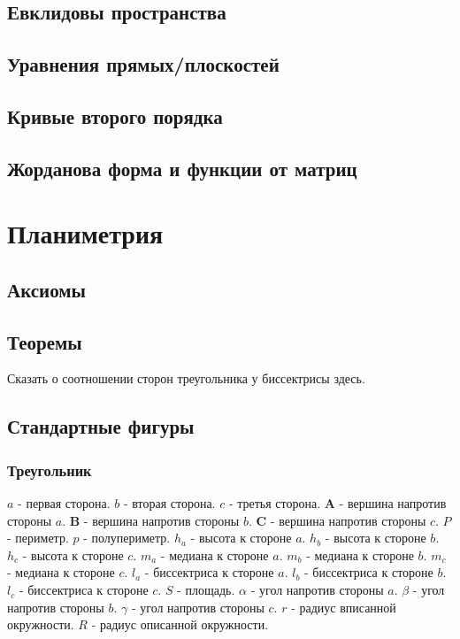 \subsection{Евклидовы пространства}

\subsection{Уравнения прямых/плоскостей}

\subsection{Кривые второго порядка}

\subsection{Жорданова форма и функции от матриц}


\section{Планиметрия}

\subsection{Аксиомы}

\subsection{Теоремы}

Сказать о соотношении сторон треугольника у биссектрисы здесь.

\subsection{Стандартные фигуры}

\subsubsection{Треугольник}

$a$ - первая сторона.
$b$ - вторая сторона.
$c$ - третья сторона.
$\boldsymbol{A}$ - вершина напротив стороны $a$.
$\boldsymbol{B}$ - вершина напротив стороны $b$.
$\boldsymbol{C}$ - вершина напротив стороны $c$.
$P$ - периметр.
$p$ - полупериметр.
$h_a$ - высота к стороне $a$.
$h_b$ - высота к стороне $b$.
$h_c$ - высота к стороне $c$.
$m_a$ - медиана к стороне $a$.
$m_b$ - медиана к стороне $b$.
$m_c$ - медиана к стороне $c$.
$l_a$ - биссектриса к стороне $a$.
$l_b$ - биссектриса к стороне $b$.
$l_c$ - биссектриса к стороне $c$.
$S$ - площадь.
$\alpha$ - угол напротив стороны $a$.
$\beta$ - угол напротив стороны $b$.
$\gamma$ - угол напротив стороны $c$.
$r$ - радиус вписанной окружности.
$R$ - радиус описанной окружности.

